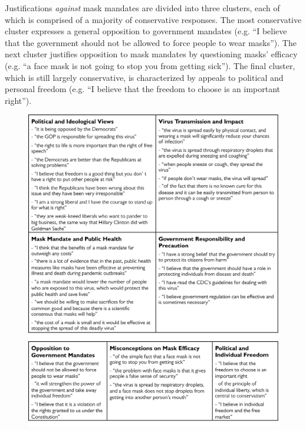 \documentclass{article} %
\begin{document}
Justifications \emph{against} mask mandates are divided into three
clusters, each of which is comprised of a majority of conservative
responses. The most conservative cluster expresses a general opposition
to government mandates (e.g. ``I believe that the government should not
be allowed to force people to wear masks''). The next cluster justifies
opposition to mask mandates by questioning masks' efficacy (e.g. ``a
face mask is not going to stop you from getting sick''). The final
cluster, which is still largely conservative, is characterized by
appeals to political and personal freedom (e.g. ``I believe that the
freedom to choose is an important right'').

\begin{figure}
  \captionsetup{justification=raggedright,singlelinecheck=false}
  \label{tab:masks}
  \centering
  \includegraphics[width=\textwidth]{./figures/media/Table3.png}

  \vspace{1cm}
  
  \label{tab:nomasks}
  \centering
  \includegraphics[width=\textwidth]{./figures/media/Table4.png}
\end{figure}
\end{document}
